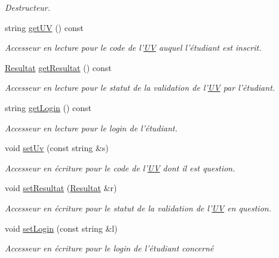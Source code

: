 \begin{DoxyCompactItemize}
\begin{DoxyCompactList}\small\item\em Destructeur. \end{DoxyCompactList}\item 
string \hyperlink{class_inscription_a139f354cf118455ab7bb561f656fa691}{get\-U\-V} () const 
\begin{DoxyCompactList}\small\item\em Accesseur en lecture pour le code de l'\hyperlink{class_u_v}{U\-V} auquel l'étudiant est inscrit. \end{DoxyCompactList}\item 
\hyperlink{_u_t_profiler_8h_a89d667cddcff9ee818f60f3d9c6ac987}{Resultat} \hyperlink{class_inscription_a4c38354111c534ed4809da99caf3822f}{get\-Resultat} () const 
\begin{DoxyCompactList}\small\item\em Accesseur en lecture pour le statut de la validation de l'\hyperlink{class_u_v}{U\-V} par l'étudiant. \end{DoxyCompactList}\item 
string \hyperlink{class_inscription_a195d9639695dc78b79f03abd89ce06a1}{get\-Login} () const 
\begin{DoxyCompactList}\small\item\em Accesseur en lecture pour le login de l'étudiant. \end{DoxyCompactList}\item 
void \hyperlink{class_inscription_a33550fc27d9a7a41c7291fe98c730973}{set\-Uv} (const string \&s)
\begin{DoxyCompactList}\small\item\em Accesseur en écriture pour le code de l'\hyperlink{class_u_v}{U\-V} dont il est question. \end{DoxyCompactList}\item 
void \hyperlink{class_inscription_aa957f1dab96c32d59dff404c054f9ad1}{set\-Resultat} (\hyperlink{_u_t_profiler_8h_a89d667cddcff9ee818f60f3d9c6ac987}{Resultat} \&r)
\begin{DoxyCompactList}\small\item\em Accesseur en écriture pour le statut de la validation de l'\hyperlink{class_u_v}{U\-V} en question. \end{DoxyCompactList}\item 
void \hyperlink{class_inscription_a9e1b9d1dd5732ba9e18160e806bfec50}{set\-Login} (const string \&l)
\begin{DoxyCompactList}\small\item\em Accesseur en écriture pour le login de l'étudiant concerné \end{DoxyCompactList}\end{DoxyCompactItemize}


